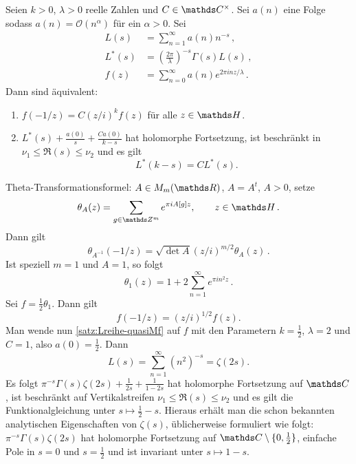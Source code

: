 \begin{satz}\label{satz:Lreihe-quasiMf}
	Seien $k > 0$, $\lambda >0$ reelle Zahlen und $C \in \CC^\times$. Sei $a(n)$ eine Folge sodass $a(n) = \mathcal O(n^\alpha)$ für ein $\alpha > 0$. Sei
	\begin{align*}
	L(s) &= \sum_{n=1}^\infty a(n)n^{-s}\,,\\
	L^*(s) &= \left( \frac{2\pi}{\lambda}\right)^{-s} \Gamma(s) L(s)\,,\\
	f(z) &= \sum_{n=0}^\infty a(n)e^{2\pi i nz/\lambda}\,.
	\end{align*}
	Dann sind äquivalent: 
	\begin{enumerate}
		\item $f(-1/z) = C (z/i)^{k} f(z)$ für alle $z \in \HH$.
		\item $L^*(s) + \frac{a(0)}{s} + \frac{Ca(0)}{k - s}$ hat holomorphe Fortsetzung, ist beschränkt in $\nu_1 \leq \Re(s) \leq \nu_2$ und es gilt 
		\[L^*(k - s) = C L^*(s).\]
	\end{enumerate}
\end{satz}


\begin{bsp}
	Theta-Transformationsformel: $A \in M_m(\RR)$, $A = A^t$, $A > 0$, setze
	\[
	\theta_A(z) = \sum_{g \in \ZZ^m} e^{\pi i A[g] z}, \qquad z \in \HH\,.
	\]
	Dann gilt 
	\[
	\theta_{A^{-1}}(-1/z) = \sqrt{\det A} (z / i)^{m/2} \theta_A(z)\,.
	\]
	Ist speziell $m=1$ und $A = 1$, so folgt 
	\[
	\theta_1(z) = 1 + 2\sum_{n=1}^\infty e^{\pi i n^2 z}\,.
	\]
	Sei $f = \frac12 \theta_1$. Dann gilt
	\[
	f(-1/z) = (z/i)^{1/2} f(z).
	\]
	Man wende nun \autoref{satz:Lreihe-quasiMf} auf $f$ mit den Parametern $k = \frac12$, $\lambda = 2$ und $C = 1$, also $a(0) = \frac12$. Dann
	\[
	L(s) = \sum_{n=1}^\infty (n^{2})^{-s} = \zeta(2s).
	\]
	Es folgt $\pi^{-s} \Gamma(s)\zeta(2s) + \frac{1}{2s} + \frac{1}{1-2s}$ hat holomorphe Fortsetzung auf $\CC$, ist beschränkt auf Vertikalstreifen $\nu_1 \leq \Re(s) \leq \nu_2$ und es gilt die Funktionalgleichung unter $s \mapsto \frac12 - s$. Hieraus erhält man die schon bekannten analytischen Eigenschaften von $\zeta(s)$, üblicherweise formuliert wie folgt: $\pi^{-s}\Gamma(s)\zeta(2s)$ hat holomorphe Fortsetzung auf $\CC \setminus \{0,\frac 12\}$, einfache Pole in $s= 0$ und $s=\frac 12$ und ist invariant  unter $s \mapsto 1 - s$.
\end{bsp} 